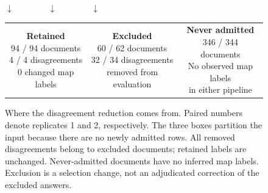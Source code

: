 \documentclass[11pt]{article}
\begin{document}
\begin{figure}[t]
\centering
\small
{}

\smallskip
$\downarrow\qquad\qquad\downarrow\qquad\qquad\downarrow$

\smallskip
\begin{tabular}{@{}ccc@{}}
\fbox{\parbox{0.27\linewidth}{\centering
\textbf{Retained}\\
94 / 94 documents\\
4 / 4 disagreements\\
0 changed map labels}}
&
\fbox{\parbox{0.27\linewidth}{\centering
\textbf{Excluded}\\
60 / 62 documents\\
32 / 34 disagreements\\
removed from evaluation}}
&
\fbox{\parbox{0.27\linewidth}{\centering
\textbf{Never admitted}\\
346 / 344 documents\\
No observed map labels\\
in either pipeline}}
\end{tabular}

\smallskip
{}
\caption{Where the disagreement reduction comes from. Paired numbers denote
replicates 1 and 2, respectively. The three boxes partition the input because
there are no newly admitted rows. All removed disagreements belong to excluded
documents; retained labels are unchanged. Never-admitted documents have no
inferred map labels. Exclusion is a selection change, not an adjudicated
correction of the excluded answers.}
\label{fig:admission-flow}
\end{figure}
\end{document}
